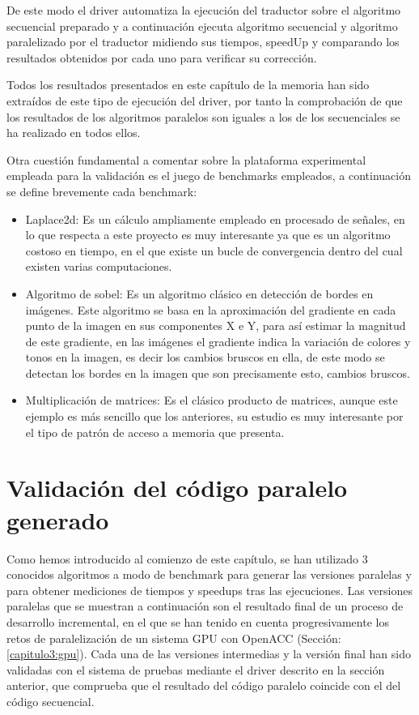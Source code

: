 De este modo el driver automatiza la ejecución del traductor sobre el algoritmo secuencial preparado y a continuación ejecuta algoritmo secuencial y algoritmo paralelizado por el traductor midiendo sus tiempos, speedUp y comparando los resultados obtenidos por cada uno para verificar su corrección.

Todos los resultados presentados en este capítulo de la memoria han sido extraídos de este tipo de ejecución del driver, por tanto la comprobación de que los resultados de los algoritmos paralelos son iguales a los de los secuenciales se ha realizado en todos ellos.

Otra cuestión fundamental a comentar sobre la plataforma experimental empleada para la validación es el juego de benchmarks empleados, a continuación se define brevemente cada benchmark:

\begin{itemize}

\item Laplace2d: Es un cálculo ampliamente empleado en procesado de señales, en lo que respecta a este proyecto es muy interesante ya que es un algoritmo costoso en tiempo, en el que existe un bucle de convergencia dentro del cual existen varias computaciones.

\item Algoritmo de sobel: Es un algoritmo clásico en detección de bordes en imágenes. Este algoritmo se basa en la aproximación del gradiente en cada punto de la imagen en sus componentes X e Y, para así estimar la magnitud de este gradiente, en las imágenes el gradiente indica la variación de colores y tonos en la imagen, es decir los cambios bruscos en ella, de este modo se detectan los bordes en la imagen que son precisamente esto, cambios bruscos.

\item Multiplicación de matrices: Es el clásico producto de matrices, aunque este ejemplo es más sencillo que los anteriores, su estudio es muy interesante por el tipo de patrón de acceso a memoria que presenta.

\end{itemize}

\section{Validación del código paralelo generado}

Como hemos introducido al comienzo de este capítulo, se han utilizado 3 conocidos algoritmos a modo de benchmark para generar las versiones paralelas y para obtener mediciones de tiempos y speedups tras las ejecuciones. 
Las versiones paralelas que se muestran a continuación son el resultado final de un proceso de desarrollo incremental, en el que se han tenido en cuenta progresivamente los retos de paralelización de un sistema GPU con OpenACC (Sección: \ref{capitulo3:gpu}). Cada una de las versiones intermedias y la versión final han sido validadas con el sistema de pruebas mediante el driver descrito en la sección anterior, que comprueba que el resultado del código paralelo coincide con el del código secuencial.

